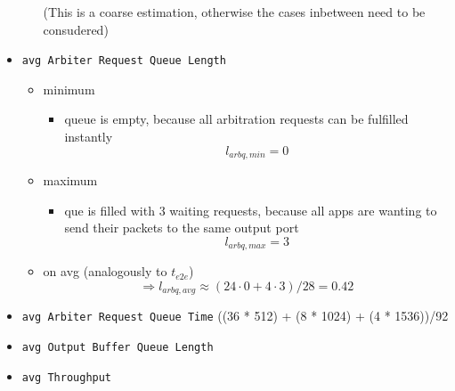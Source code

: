 \documentclass[]{scrartcl}
\begin{document}
\begin{itemize}
\begin{itemize}
                    (This is a coarse estimation, otherwise the cases inbetween need to be consudered)
            \end{itemize}
        \item \verb|avg Arbiter Request Queue Length|
            \begin{itemize}
                \item minimum
                    \begin{itemize}
                        \item queue is empty, because all arbitration requests can be fulfilled instantly
                            \begin{equation}
                                l_{arbq,min} = 0
                            \end{equation}
                    \end{itemize}
                \item maximum
                    \begin{itemize}
                        \item que is filled with 3 waiting requests, because all apps are wanting to send their packets to the same output port
                            \begin{equation}
                                l_{arbq,max} = 3
                            \end{equation}
                    \end{itemize}
                \item on avg (analogously to $t_{e2e}$)
                    \begin{equation}
                        \Rightarrow l_{arbq,avg} \approx \left(24\cdot 0+4\cdot 3 \right)/28 = 0.42
                    \end{equation}
            \end{itemize}
        \item \verb|avg Arbiter Request Queue Time|
            ((36 * 512) + (8 * 1024) + (4 * 1536))/92
        \item \verb|avg Output Buffer Queue Length|
        \item \verb|avg Throughput|
    \end{itemize}
\end{document}
